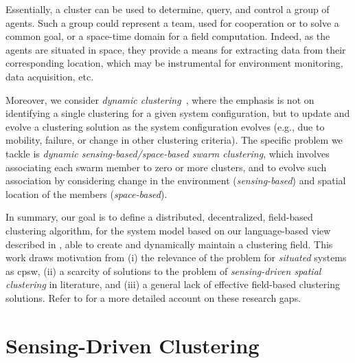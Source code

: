 Essentially, a cluster can be used to determine, query, and control a group of agents.
%
Such a group could represent a team, used for cooperation or to solve a common goal,
 or a space-time domain for a field computation.
%
Indeed, as the agents are situated in space,
 they provide a means for extracting data
 from their corresponding location,
 which may be instrumental for environment monitoring,
 data acquisition, etc.

Moreover, we consider \emph{dynamic clustering}~\cite{DBLP:journals/pr/RoaTG19},
 where the emphasis is not on identifying a single clustering
 for a given system configuration,
 but to update and evolve a clustering solution
 as the system configuration evolves
 (e.g., due to mobility, failure, or change in other clustering criteria).
%
The specific problem we tackle is \emph{dynamic sensing-based/space-based swarm clustering},
 which involves associating each swarm member
 to zero or more clusters, and to evolve such association by considering change in the environment (\emph{sensing-based}) and spatial location of the members (\emph{space-based}).
%

In summary, our goal is to define a distributed, decentralized, field-based
 clustering algorithm,
 for the system model based on our language-based view
 described in ,
 able to create and dynamically maintain a clustering field.
%
%
%
This work draws motivation
 from
 (i) the relevance of the problem for \emph{situated} systems as \ac{cpsw},
 (ii) a scarcity of solutions to the problem of \emph{sensing-driven spatial clustering} in literature,
 and
 (iii) a general lack of effective field-based clustering solutions.
%
Refer to  for a more detailed account on these research gaps.


\section{Sensing-Driven Clustering}
\label{s:contrib}

